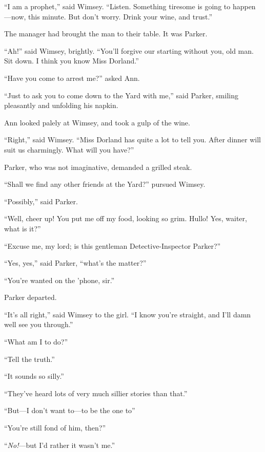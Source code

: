 \enquote{I am a prophet,} said Wimsey. \enquote{Listen. Something tiresome is going to happen\allowbreak---\allowbreak now, this minute. But don't worry. Drink your wine, and trust.}

The manager had brought the man to their table. It was Parker.

\enquote{Ah!} said Wimsey, brightly. \enquote{You'll forgive our starting without you, old man. Sit down. I think you know Miss Dorland.}

\enquote{Have you come to arrest me?} asked Ann.

\enquote{Just to ask you to come down to the Yard with me,} said Parker, smiling pleasantly and unfolding his napkin.

Ann looked palely at Wimsey, and took a gulp of the wine.

\enquote{Right,} said Wimsey. \enquote{Miss Dorland has quite a lot to tell you. After dinner will suit us charmingly. What will you have?}

Parker, who was not imaginative, demanded a grilled steak.

\enquote{Shall we find any other friends at the Yard?} pursued Wimsey.

\enquote{Possibly,} said Parker.

\enquote{Well, cheer up! You put me off my food, looking so grim. Hullo! Yes, waiter, what is it?}

\enquote{Excuse me, my lord; is this gentleman Detective-Inspector Parker?}

\enquote{Yes, yes,} said Parker, \enquote{what's the matter?}

\enquote{You're wanted on the 'phone, sir.}

Parker departed.

\enquote{It's all right,} said Wimsey to the girl. \enquote{I know you're straight, and I'll damn well see you through.}

\enquote{What am I to do?}

\enquote{Tell the truth.}

\enquote{It sounds so silly.}

\enquote{They've heard lots of very much sillier stories than that.}

\enquote{But\allowbreak---\allowbreak I don't want to\allowbreak---\allowbreak to be the one to\longdash}

\enquote{You're still fond of him, then?}

\enquote{\textit{No!}---but I'd rather it wasn't me.}

